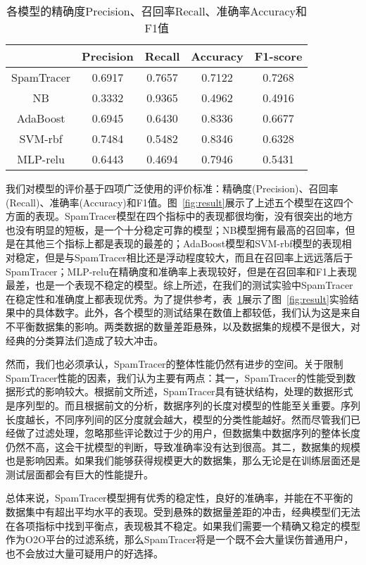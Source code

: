 \begin{table}[htb]
	\centering
	\caption[各模型的精确度Precision、召回率Recall、准确率Accuracy和F1值]{各模型的精确度Precision、召回率Recall、准确率Accuracy和F1值}
	\label{tbl:Result}
	\begin{tabular}{ccccc}	
		\toprule
		& Precision & Recall & Accuracy & F1-score \\
		\midrule
		SpamTracer & 0.6917  & 0.7657 & 0.7122   &	0.7268 \\
		NB				& 0.3332  &	0.9365 & 0.4962   &	0.4916 \\
		AdaBoost		& 0.6945  &	0.6430 & 0.8336   &	0.6677 \\
		SVM-rbf			& 0.7484  &	0.5482 & 0.8346   &	0.6328 \\
		MLP-relu		& 0.6443  &	0.4694 & 0.7946   &	0.5431 \\
		\bottomrule
	\end{tabular}
\end{table}

我们对模型的评价基于四项广泛使用的评价标准：精确度(Precision)、召回率(Recall)、准确率(Accuracy)和F1值。图~\ref{fig:result}展示了上述五个模型在这四个方面的表现。SpamTracer模型在四个指标中的表现都很均衡，没有很突出的地方也没有明显的短板，是一个十分稳定可靠的模型；NB模型拥有最高的召回率，但是在其他三个指标上都是表现的最差的；AdaBoost模型和SVM-rbf模型的表现相对稳定，但是与SpamTracer相比还是浮动程度较大，而且在召回率上远远落后于SpamTracer；MLP-relu在精确度和准确率上表现较好，但是在召回率和F1上表现最差，也是一个表现不稳定的模型。综上所述，在我们的测试实验中SpamTracer在稳定性和准确度上都表现优秀。为了提供参考，表~\ref{tbl:Result}展示了图~\ref{fig:result}实验结果中的具体数字。此外，各个模型的测试结果在数值上都较低，我们认为这是来自不平衡数据集的影响。两类数据的数量差距悬殊，以及数据集的规模不是很大，对经典的分类算法们造成了较大冲击。

然而，我们也必须承认，SpamTracer的整体性能仍然有进步的空间。关于限制SpamTracer性能的因素，我们认为主要有两点：其一，SpamTracer的性能受到数据形式的影响较大。根据前文所述，SpamTracer具有链状结构，处理的数据形式是序列型的。而且根据前文的分析，数据序列的长度对模型的性能至关重要。序列长度越长，不同序列间的区分度就会越大，模型的分类性能越好。然而尽管我们已经做了过滤处理，忽略那些评论数过于少的用户，但数据集中数据序列的整体长度仍然不高，这会干扰模型的判断，导致准确率没有达到很高。其二，数据集的规模也是影响因素。如果我们能够获得规模更大的数据集，那么无论是在训练层面还是测试层面都会有巨大的性能提升。

总体来说，SpamTracer模型拥有优秀的稳定性，良好的准确率，并能在不平衡的数据集中有超出平均水平的表现。受到悬殊的数据量差距的冲击，经典模型们无法在各项指标中找到平衡点，表现极其不稳定。如果我们需要一个精确又稳定的模型作为O2O平台的过滤系统，那么SpamTracer将是一个既不会大量误伤普通用户，也不会放过大量可疑用户的好选择。


